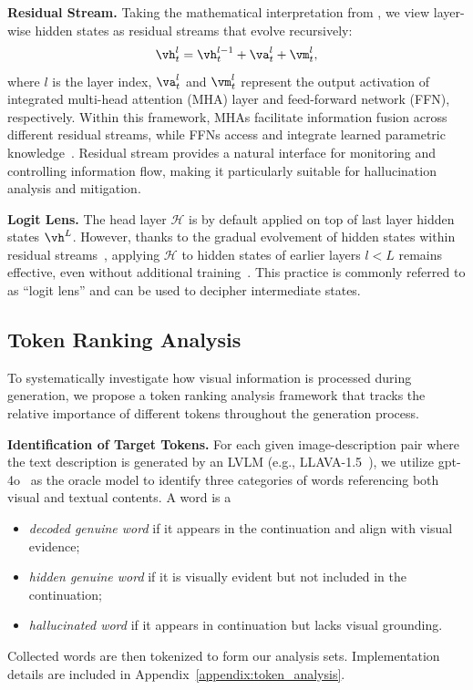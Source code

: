 \documentclass{article}
\theoremstyle{plain}
\theoremstyle{definition}
\theoremstyle{remark}
\begin{document}
\textbf{Residual Stream.} Taking the mathematical interpretation from \citet{elhage2021mathematical}, we view layer-wise hidden states as residual streams that evolve recursively:
\begin{equation}
\vh_t^l = \vh^{l-1}_t + \va^l_t + \vm^l_t,
\end{equation}
where $l$ is the layer index, $\va^l_t$ and $\vm^l_t$ represent the output activation of integrated multi-head attention (MHA) layer and feed-forward network (FFN), respectively. Within this framework, MHAs facilitate information fusion across different residual streams, while FFNs access and integrate learned parametric knowledge~\cite{geva-etal-2021-transformer, dai-etal-2022-knowledge}. Residual stream provides a natural interface for monitoring and controlling information flow, making it particularly suitable for hallucination analysis and mitigation.

\textbf{Logit Lens.} The head layer $\mathcal{H}$ is by default applied on top of last layer hidden states $\vh^L$. However, thanks to the gradual evolvement of hidden states within residual streams~\cite{dola}, applying $\mathcal{H}$ to hidden states of earlier layers $l<L$ remains effective, even without additional training~\cite{logitlen}. This practice is commonly referred to as ``logit lens'' and can be used to decipher intermediate states.

\subsection{Token Ranking Analysis}\label{sec:token_analysis}
To systematically investigate how visual information is processed during generation, we propose a token ranking analysis framework that tracks the relative importance of different tokens throughout the generation process.

\textbf{Identification of Target Tokens.} 
For each given image-description pair where the text description is generated by an LVLM (e.g., LLAVA-1.5~\cite{llava15}), we utilize gpt-4o~\cite{hurst2024gpt} as the oracle model to identify three categories of words referencing both visual and textual contents. A word is a 
\begin{itemize}[nosep,leftmargin=16pt]
    \item \emph{decoded genuine word} if it appears in the continuation and align with visual evidence;
    \item \emph{hidden genuine word} if it is visually evident but not included in the continuation;
    \item \emph{hallucinated word} if it appears in continuation but lacks visual grounding.
\end{itemize}   
Collected words are then tokenized to form our analysis sets. Implementation details are included in Appendix~\ref{appendix:token_analysis}.
\end{document}
